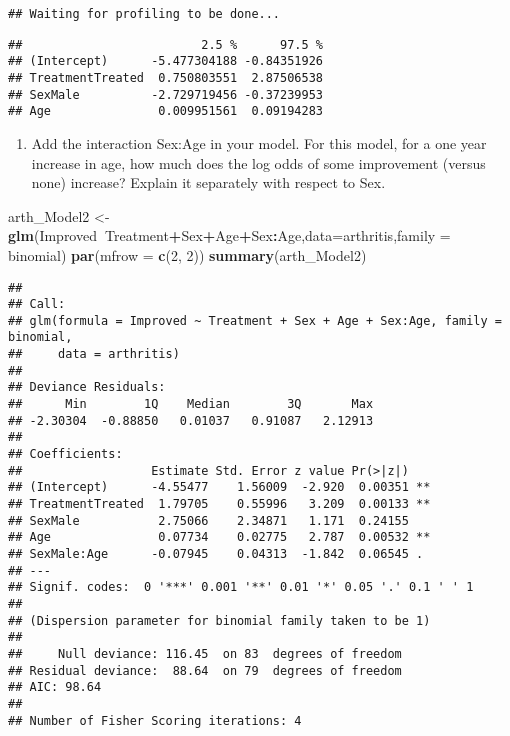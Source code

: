 \documentclass[]{article}
\newenvironment{Shaded}{\begin{snugshade}}{\end{snugshade}}
\newcommand{\KeywordTok}[1]{\textcolor[rgb]{0.13,0.29,0.53}{\textbf{#1}}}
\newcommand{\DataTypeTok}[1]{\textcolor[rgb]{0.13,0.29,0.53}{#1}}
\newcommand{\DecValTok}[1]{\textcolor[rgb]{0.00,0.00,0.81}{#1}}
\newcommand{\StringTok}[1]{\textcolor[rgb]{0.31,0.60,0.02}{#1}}
\newcommand{\OperatorTok}[1]{\textcolor[rgb]{0.81,0.36,0.00}{\textbf{#1}}}
\newcommand{\NormalTok}[1]{#1}
\providecommand{\tightlist}{%
  \setlength{\itemsep}{0pt}\setlength{\parskip}{0pt}}
\begin{document}
\begin{verbatim}
## Waiting for profiling to be done...
\end{verbatim}

\begin{verbatim}
##                         2.5 %      97.5 %
## (Intercept)      -5.477304188 -0.84351926
## TreatmentTreated  0.750803551  2.87506538
## SexMale          -2.729719456 -0.37239953
## Age               0.009951561  0.09194283
\end{verbatim}

\begin{enumerate}
\def\labelenumi{(\alph{enumi})}
\setcounter{enumi}{4}
\tightlist
\item
  Add the interaction Sex:Age in your model. For this model, for a one
  year increase in age, how much does the log odds of some improvement
  (versus none) increase? Explain it separately with respect to Sex.
\end{enumerate}

\begin{Shaded}
\begin{Highlighting}[]
\NormalTok{arth_Model2 <-}\StringTok{ }\KeywordTok{glm}\NormalTok{(Improved}\OperatorTok{~}\NormalTok{Treatment}\OperatorTok{+}\NormalTok{Sex}\OperatorTok{+}\NormalTok{Age}\OperatorTok{+}\NormalTok{Sex}\OperatorTok{:}\NormalTok{Age,}\DataTypeTok{data=}\NormalTok{arthritis,}\DataTypeTok{family =}\NormalTok{ binomial)}
\KeywordTok{par}\NormalTok{(}\DataTypeTok{mfrow =} \KeywordTok{c}\NormalTok{(}\DecValTok{2}\NormalTok{, }\DecValTok{2}\NormalTok{))}
\KeywordTok{summary}\NormalTok{(arth_Model2)}
\end{Highlighting}
\end{Shaded}

\begin{verbatim}
## 
## Call:
## glm(formula = Improved ~ Treatment + Sex + Age + Sex:Age, family = binomial, 
##     data = arthritis)
## 
## Deviance Residuals: 
##      Min        1Q    Median        3Q       Max  
## -2.30304  -0.88850   0.01037   0.91087   2.12913  
## 
## Coefficients:
##                  Estimate Std. Error z value Pr(>|z|)   
## (Intercept)      -4.55477    1.56009  -2.920  0.00351 **
## TreatmentTreated  1.79705    0.55996   3.209  0.00133 **
## SexMale           2.75066    2.34871   1.171  0.24155   
## Age               0.07734    0.02775   2.787  0.00532 **
## SexMale:Age      -0.07945    0.04313  -1.842  0.06545 . 
## ---
## Signif. codes:  0 '***' 0.001 '**' 0.01 '*' 0.05 '.' 0.1 ' ' 1
## 
## (Dispersion parameter for binomial family taken to be 1)
## 
##     Null deviance: 116.45  on 83  degrees of freedom
## Residual deviance:  88.64  on 79  degrees of freedom
## AIC: 98.64
## 
## Number of Fisher Scoring iterations: 4
\end{verbatim}
\end{document}
